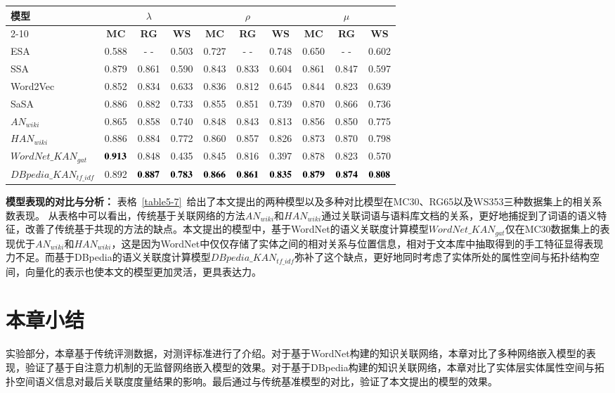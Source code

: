 \begin{table*}[htbp]
    \center
    \vspace{5pt}
    \begin{tabular}{l|c|c|c|c|c|c|c|c|c}
    \hline
    \multirow{2}{*}{模型} & \multicolumn{3}{c|}{$\lambda$}     & \multicolumn{3}{c|}{$\rho$}          & \multicolumn{3}{c}{$\mu$} \\ \cline{2-10} 
                           & \textbf{MC}&\textbf{RG}&\textbf{WS} & \textbf{MC}&\textbf{RG}&\textbf{WS} & \textbf{MC}&\textbf{RG}&\textbf{WS}\\ \hline
    ESA                    & 0.588 &  - -  & 0.503 & 0.727 &  - -  & 0.748 & 0.650 &  - - & 0.602    \\ \hline
    SSA                    & 0.879 & 0.861 & 0.590 & 0.843 & 0.833 & 0.604 & 0.861 & 0.847 & 0.597   \\ \hline
    Word2Vec               & 0.852 & 0.834 & 0.633 & 0.836 & 0.812 & 0.645 & 0.844 & 0.823 & 0.639   \\ \hline
    SaSA                   & 0.886 & 0.882 & 0.733 & 0.855 & 0.851 & 0.739 & 0.870 & 0.866 & 0.736   \\ \hline
    $AN_{wiki}$            & 0.865 & 0.858 & 0.740 & 0.848 & 0.843 & 0.813 & 0.856 & 0.850 & 0.775   \\ \hline
    $HAN_{wiki}$           & 0.886 & 0.884 & 0.772 & 0.860 & 0.857 & 0.826 & 0.873 & 0.870 & 0.798   \\ \hline
    $WordNet\_KAN_{gat}$   & $\bf 0.913$ & 0.848 & 0.435 & 0.845 & 0.816 & 0.397 & 0.878  & 0.823 & 0.570 \\ \hline
    $DBpedia\_KAN_{tf\_idf}$        & 0.892 & $\bf 0.887$ & $\bf 0.783$ & $\bf 0.866$ & $\bf 0.861$ & $\bf 0.835$ & $\bf 0.879$ & $\bf 0.874$ & $\bf 0.808$ \\ \hline
    \end{tabular}
    \label{table5-7}
\end{table*}

\textbf{模型表现的对比与分析：}
表格~\ref{table5-7}~给出了本文提出的两种模型以及多种对比模型在MC30、RG65以及WS353三种数据集上的相关系数表现。
从表格中可以看出，传统基于关联网络的方法$AN_{wiki}$和$HAN_{wiki}$通过关联词语与语料库文档的关系，更好地捕捉到了词语的语义特征，改善了传统基于共现的方法的缺点。本文提出的模型中，基于WordNet的语义关联度计算模型$WordNet\_KAN_{gat}$仅在MC30数据集上的表现优于$AN_{wiki}$和$HAN_{wiki}$，这是因为WordNet中仅仅存储了实体之间的相对关系与位置信息，相对于文本库中抽取得到的手工特征显得表现力不足。而基于DBpedia的语义关联度计算模型$DBpedia\_KAN_{tf\_idf}$弥补了这个缺点，更好地同时考虑了实体所处的属性空间与拓扑结构空间，向量化的表示也使本文的模型更加灵活，更具表达力。


\section{本章小结}
实验部分，本章基于传统评测数据，对测评标准进行了介绍。对于基于WordNet构建的知识关联网络，本章对比了多种网络嵌入模型的表现，验证了基于自注意力机制的无监督网络嵌入模型的效果。对于基于DBpedia构建的知识关联网络，本章对比了实体层实体属性空间与拓扑空间语义信息对最后关联度度量结果的影响。最后通过与传统基准模型的对比，验证了本文提出的模型的效果。
